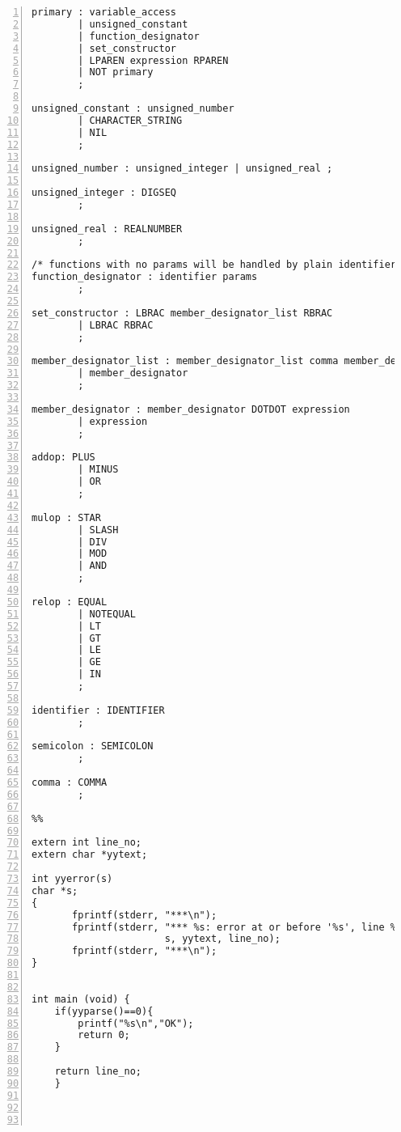 \begin{Verbatim}[numbers=left]
primary : variable_access
        | unsigned_constant
        | function_designator
        | set_constructor
        | LPAREN expression RPAREN
        | NOT primary
        ;

unsigned_constant : unsigned_number
        | CHARACTER_STRING
        | NIL
        ;

unsigned_number : unsigned_integer | unsigned_real ;

unsigned_integer : DIGSEQ
        ;

unsigned_real : REALNUMBER
        ;

/* functions with no params will be handled by plain identifier */
function_designator : identifier params
        ;

set_constructor : LBRAC member_designator_list RBRAC
        | LBRAC RBRAC
        ;

member_designator_list : member_designator_list comma member_designator
        | member_designator
        ;

member_designator : member_designator DOTDOT expression
        | expression
        ;

addop: PLUS
        | MINUS
        | OR
        ;

mulop : STAR
        | SLASH
        | DIV
        | MOD
        | AND
        ;

relop : EQUAL
        | NOTEQUAL
        | LT
        | GT
        | LE
        | GE
        | IN
        ;

identifier : IDENTIFIER
        ;

semicolon : SEMICOLON
        ;

comma : COMMA
        ;

%%

extern int line_no;
extern char *yytext;

int yyerror(s)
char *s;
{
       fprintf(stderr, "***\n");
       fprintf(stderr, "*** %s: error at or before '%s', line %d\n", 
                       s, yytext, line_no);
       fprintf(stderr, "***\n");
}


int main (void) {
	if(yyparse()==0){
		printf("%s\n","OK");
		return 0;
	}
	
	return line_no;
	}




\end{Verbatim}